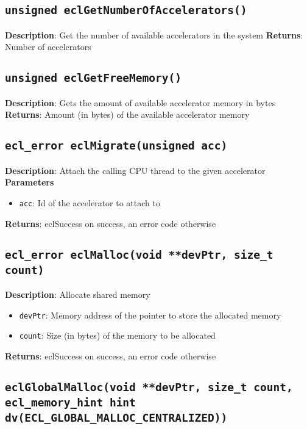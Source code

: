 \subsection{\texttt{unsigned eclGetNumberOfAccelerators()}}

\textbf{Description}: Get the number of available accelerators in the system
\textbf{Returns}: Number of accelerators

\subsection{\texttt{unsigned eclGetFreeMemory()}}

\textbf{Description}: Gets the amount of available accelerator memory in bytes
\textbf{Returns}: Amount (in bytes) of the available accelerator memory

\subsection{\texttt{ecl\_error eclMigrate(unsigned acc)}}

\textbf{Description}: Attach the calling CPU thread to the given accelerator
\textbf{Parameters}
\begin{itemize}
  \item \texttt{acc}: Id of the accelerator to attach to
\end{itemize}
\textbf{Returns}: eclSuccess on success, an error code otherwise

\subsection{\texttt{ecl\_error eclMalloc(void **devPtr, size\_t count)}}

\textbf{Description}: Allocate shared memory
\begin{itemize}
  \item \texttt{devPtr}: Memory address of the pointer to store the allocated memory
  \item \texttt{count}: Size (in bytes) of the memory to be allocated
\end{itemize}
\textbf{Returns}: eclSuccess on success, an error code otherwise

\subsection{\texttt{eclGlobalMalloc(void **devPtr, size\_t count, ecl\_memory\_hint hint dv(ECL\_GLOBAL\_MALLOC\_CENTRALIZED))}}

